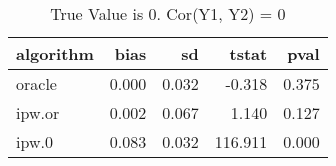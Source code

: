 \begin{table}[h!]

\caption{True Value is 0. Cor(Y1, Y2) = 0}
\centering
\begin{tabular}[t]{lrrrr}
\toprule
algorithm & bias & sd & tstat & pval\\
\midrule
oracle & 0.000 & 0.032 & -0.318 & 0.375\\
ipw.or & 0.002 & 0.067 & 1.140 & 0.127\\
ipw.0 & 0.083 & 0.032 & 116.911 & 0.000\\
\bottomrule
\end{tabular}
\end{table}
